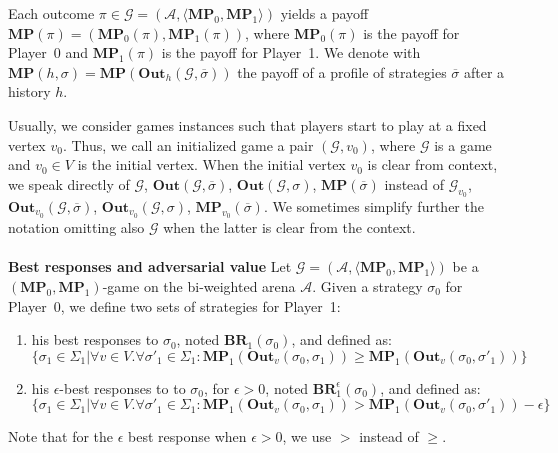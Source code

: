 Each outcome $\pi \in \mathcal{G} = (\mathcal{A},\langle \mathbf{MP}_0, \mathbf{MP}_1\rangle)$ yields a payoff $\mathbf{MP}(\pi)=(\mathbf{MP}_0(\pi),\mathbf{MP}_1(\pi))$, where $\mathbf{MP}_0(\pi)$ is the payoff for Player~0 and $\mathbf{MP}_1(\pi)$ is the payoff for Player~1. We denote with $\mathbf{MP}(h, \sigma) = \mathbf{MP}(\mathbf{Out}_h(\mathcal{G}, \overline{\sigma}))$ the payoff of a profile of strategies $\overline{\sigma}$ after a history $h$.

Usually, we consider games instances such that players start to play at a fixed vertex $v_0$. Thus, we call an initialized game a pair $(\mathcal{G}, v_0)$, where $\mathcal{G}$ is a game and $v_0 \in V$ is the initial vertex. When the initial vertex $v_0$ is clear from context, we speak directly of $\mathcal{G}$, $\mathbf{Out}(\mathcal{G}, \overline{\sigma})$, $\mathbf{Out}(\mathcal{G},\sigma)$, $\mathbf{MP}(\overline{\sigma})$ instead of $\mathcal{G}_{v_0}$, $\mathbf{Out}_{v_0}(\mathcal{G}, \overline{\sigma})$, $\mathbf{Out}_{v_0}(\mathcal{G},\sigma)$, $\mathbf{MP}_{v_0}(\overline{\sigma})$. We sometimes simplify further the notation omitting also $\mathcal{G}$ when the latter is clear from the context.
\\
\\
\noindent\textbf{Best responses and adversarial value} Let $\mathcal{G} = (\mathcal{A},\langle \mathbf{MP}_0, \mathbf{MP}_1\rangle)$ be a $(\mathbf{MP}_0, \mathbf{MP}_1)$-game on the bi-weighted arena $\mathcal{A}$. Given a strategy $\sigma_0$ for Player~0, we define two sets of strategies for Player~1:
\\

\begin{enumerate}
\item 
his best responses to $\sigma_0$, noted $\mathbf{BR}_1(\sigma_0)$, and defined as:
\begin{equation*}
    \{\sigma_1 \in \Sigma_1 | \forall v \in V . \forall \sigma'_1 \in \Sigma _1: \mathbf{MP}_1(\mathbf{Out}_v(\sigma_0,\sigma_1)) \geqslant \mathbf{MP}_1(\mathbf{Out}_v(\sigma_0,\sigma'_1))\}
\end{equation*}

\item \label{epsion_gt_0}
his $\epsilon$-best responses to to $\sigma_0$, for $\epsilon > 0$, noted $\mathbf{BR}^{\epsilon}_1(\sigma_0)$, and defined as:
\begin{equation*}
    \{\sigma_1 \in \Sigma_1 | \forall v \in V . \forall \sigma'_1 \in \Sigma _1: \mathbf{MP}_1(\mathbf{Out}_v(\sigma_0,\sigma_1)) > \mathbf{MP}_1(\mathbf{Out}_v(\sigma_0,\sigma'_1)) - \epsilon\}
\end{equation*}
\end{enumerate}
Note that for the $\epsilon$ best response when $\epsilon > 0$, we use $>$ instead of $\geqslant$.

